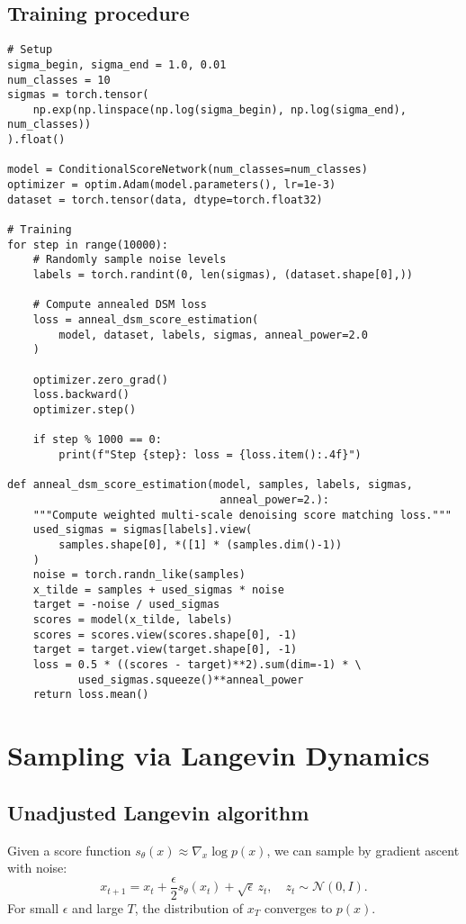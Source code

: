 \documentclass[11pt]{article}
\theoremstyle{definition}
\begin{document}
\subsection{Training procedure}
\begin{lstlisting}[style=py,caption={NCSN training loop}]
# Setup
sigma_begin, sigma_end = 1.0, 0.01
num_classes = 10
sigmas = torch.tensor(
    np.exp(np.linspace(np.log(sigma_begin), np.log(sigma_end), num_classes))
).float()

model = ConditionalScoreNetwork(num_classes=num_classes)
optimizer = optim.Adam(model.parameters(), lr=1e-3)
dataset = torch.tensor(data, dtype=torch.float32)

# Training
for step in range(10000):
    # Randomly sample noise levels
    labels = torch.randint(0, len(sigmas), (dataset.shape[0],))
    
    # Compute annealed DSM loss
    loss = anneal_dsm_score_estimation(
        model, dataset, labels, sigmas, anneal_power=2.0
    )
    
    optimizer.zero_grad()
    loss.backward()
    optimizer.step()
    
    if step % 1000 == 0:
        print(f"Step {step}: loss = {loss.item():.4f}")

def anneal_dsm_score_estimation(model, samples, labels, sigmas, 
                                 anneal_power=2.):
    """Compute weighted multi-scale denoising score matching loss."""
    used_sigmas = sigmas[labels].view(
        samples.shape[0], *([1] * (samples.dim()-1))
    )
    noise = torch.randn_like(samples)
    x_tilde = samples + used_sigmas * noise
    target = -noise / used_sigmas
    scores = model(x_tilde, labels)
    scores = scores.view(scores.shape[0], -1)
    target = target.view(target.shape[0], -1)
    loss = 0.5 * ((scores - target)**2).sum(dim=-1) * \
           used_sigmas.squeeze()**anneal_power
    return loss.mean()
\end{lstlisting}

\section{Sampling via Langevin Dynamics}

\subsection{Unadjusted Langevin algorithm}
Given a score function $s_\theta(x) \approx \nabla_x \log p(x)$, 
we can sample by gradient ascent with noise:
\begin{equation}
\label{eq:langevin}
x_{t+1} = x_t + \frac{\epsilon}{2} s_\theta(x_t) + \sqrt{\epsilon}\, z_t, 
\quad z_t \sim \mathcal{N}(0, I).
\end{equation}
For small $\epsilon$ and large $T$, the distribution of $x_T$ converges to $p(x)$.
\end{document}

